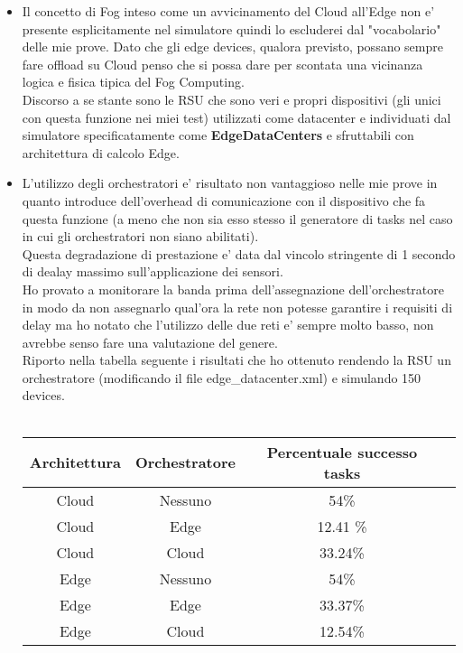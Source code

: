 \documentclass[12pt, a4paper]{report} %
\begin{document}
\begin{itemize}
 	\item Il concetto di Fog inteso come un avvicinamento del Cloud all'Edge non e' presente esplicitamente nel simulatore quindi lo escluderei dal "vocabolario" delle mie prove.
 	Dato che gli edge devices, qualora previsto, possano sempre fare offload su Cloud penso che si possa dare per scontata una vicinanza logica e fisica tipica del Fog Computing.\\
 	Discorso a se stante sono le RSU che sono veri e propri dispositivi (gli unici con questa funzione nei miei test) utilizzati come datacenter e individuati dal simulatore specificatamente come \textbf{EdgeDataCenters} e sfruttabili con architettura di calcolo Edge.
 	\item L'utilizzo degli orchestratori e' risultato non vantaggioso nelle mie prove in quanto introduce dell'overhead di comunicazione con il dispositivo che fa questa funzione (a meno che non sia esso stesso il generatore di tasks nel caso in cui gli orchestratori non siano abilitati).\\
	Questa degradazione di prestazione e' data dal vincolo stringente di 1 secondo di dealay massimo sull'applicazione dei sensori.\\
	Ho provato a monitorare la banda prima dell'assegnazione dell'orchestratore in modo da non assegnarlo qual'ora la rete non potesse garantire i requisiti di delay ma ho notato che l'utilizzo delle due reti e' sempre molto basso, non avrebbe senso fare una valutazione del genere.\\
	Riporto nella tabella seguente i risultati che ho ottenuto rendendo la RSU un orchestratore (modificando il file edge\_datacenter.xml) e simulando 150 devices.\\
	\\
 	\begin{tabular}{| c | c | c || c ||} %
		\hline
		Architettura & Orchestratore & Percentuale successo tasks\\ [1ex] 
		\hline
		\hline
		Cloud & Nessuno & 54\%\\
		\hline
		Cloud & Edge & 12.41 \%\\
		\hline
		Cloud & Cloud & 33.24\%\\
		\hline
		Edge & Nessuno & 54\%\\
		\hline
		Edge & Edge & 33.37\%\\
		\hline
		Edge & Cloud & 12.54\%\\
		\hline
\end{tabular}
	\\

\end{itemize}
\end{document}
